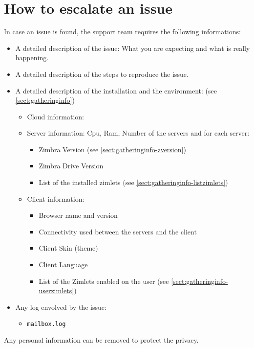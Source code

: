 \section[Escalate an issue]{How to escalate an issue}
\label{sect:how_to_escalate_an_issue}
    In case an issue is found, the support team requires the following informations:
    \begin{itemize}
        \item A detailed description of the issue: What you are expecting and what is really happening.
        \item A detailed description of the steps to reproduce the issue.
        \item A detailed description of the installation and the environment: (see \autoref{sect:gatheringinfo})
        \begin{itemize}
            \item Cloud information: 
            \item Server information: Cpu, Ram, Number of the servers and for each server:
            \begin{itemize}
                \item Zimbra Version (see \autoref{sect:gatheringinfo-zversion})
                \item Zimbra Drive Version
                \item List of the installed zimlets (see \autoref{sect:gatheringinfo-listzimlets})
            \end{itemize}
            \item Client information:
            \begin{itemize}
                \item Browser name and version
                \item Connectivity used between the servers and the client
                \item Client Skin (theme)
                \item Client Language
                \item List of the Zimlets enabled on the user (see \autoref{sect:gatheringinfo-userzimlets})
            \end{itemize}
        \end{itemize}
        \item Any log envolved by the issue:
        \begin{itemize}
            \item \texttt{mailbox.log}
        \end{itemize}
    \end{itemize}
    Any personal information can be removed to protect the privacy.
